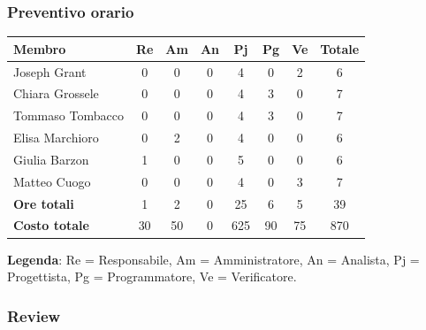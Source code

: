 \documentclass[11pt,a4paper]{article}
\begin{document}
\subsubsection{Preventivo orario}
\begin{center}
    \begin{tabular}{|l|c|c|c|c|c|c|c|}
        \hline
        \textbf{Membro} & \textbf{Re} & \textbf{Am} & \textbf{An} & \textbf{Pj} & \textbf{Pg} & \textbf{Ve} & \textbf{Totale} \\
        \hline
        Joseph Grant & 0 & 0 & 0 & 4 & 0 & 2 & 6 \\
        \hline
        Chiara Grossele & 0 & 0 & 0 & 4 & 3 & 0 & 7 \\
        \hline
        Tommaso Tombacco & 0 & 0 & 0 & 4 & 3 & 0 & 7 \\
        \hline
        Elisa Marchioro & 0 & 2 & 0 & 4 & 0 & 0 & 6 \\
        \hline
        Giulia Barzon & 1 & 0 & 0 & 5 & 0 & 0 & 6 \\
        \hline
        Matteo Cuogo & 0 & 0 & 0 & 4 & 0 & 3 & 7 \\
        \hline
        \textbf{Ore totali} & 1 & 2 & 0 & 25 & 6 & 5 & 39 \\
        \hline
        \textbf{Costo totale} & 30 & 50 & 0 & 625 & 90 & 75 & 870 \\
        \hline
    \end{tabular}
\end{center}

\noindent \textbf{Legenda}: Re = Responsabile, Am = Amministratore, An = Analista, Pj = Progettista, Pg = Programmatore, Ve = Verificatore.

\subsubsection{Review}
\end{document}
